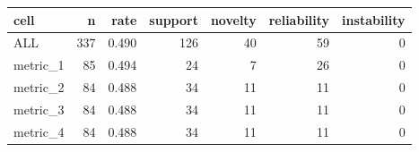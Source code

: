 \begin{tabular}{lrrrrrr}
\toprule
cell & n & rate & support & novelty & reliability & instability \\
\midrule
ALL & 337 & 0.490 & 126 & 40 & 59 & 0 \\
metric\_1 & 85 & 0.494 & 24 & 7 & 26 & 0 \\
metric\_2 & 84 & 0.488 & 34 & 11 & 11 & 0 \\
metric\_3 & 84 & 0.488 & 34 & 11 & 11 & 0 \\
metric\_4 & 84 & 0.488 & 34 & 11 & 11 & 0 \\
\bottomrule
\end{tabular}
